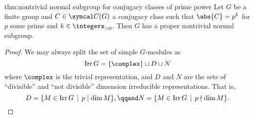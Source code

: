 \begin{thm}{}{thm:nontrivial normal subgroup for conjugacy classes of prime power}
    Let \(G\) be a finite group and \(C \in \conjugacyClasses(G)\) a conjugacy class such that \(\abs{C} = p^k\) for \(p\) some prime and \(k \in \integers_{> 0}\).
    Then \(G\) has a proper nontrivial normal subgroup.
    \begin{proof}
        We may always split the set of simple \(G\)-modules as
        \begin{equation}
            \Irr G = \{\complex\} \sqcup D \sqcup N
        \end{equation}
        where \(\complex\) is the trivial representation, and \(D\) and \(N\) are the sets of \enquote{divisible} and \enquote{not divisible} dimension irreducible representations.
        That is,
        \begin{equation}
            D = \{M \in \Irr G \, \mid \, p \mid \dim M\}, \qqand N = \{M \in \Irr G \, \mid \, p \nmid \dim M\}.
        \end{equation}
        

\end{proof}
\end{thm}
